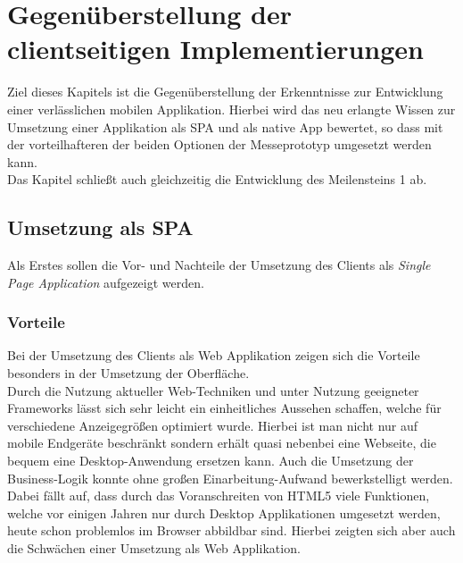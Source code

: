 \chapter{Gegenüberstellung der clientseitigen Implementierungen}
\label{cha:gegenueberstellung}
Ziel dieses Kapitels ist die Gegenüberstellung der Erkenntnisse zur Entwicklung einer verlässlichen mobilen Applikation. Hierbei wird das neu erlangte Wissen zur Umsetzung einer Applikation als SPA und als native App bewertet, so dass mit der vorteilhafteren der beiden Optionen der Messeprototyp umgesetzt werden kann. \\
Das Kapitel schließt auch gleichzeitig die Entwicklung des Meilensteins 1 ab.

\section{Umsetzung als SPA}
\label{sec:gegenueberstellung-SPA}
Als Erstes sollen die Vor- und Nachteile der Umsetzung des Clients als \textit{Single Page Application} aufgezeigt werden.

\subsection{Vorteile}
\label{sec:vorteile-SPA}
Bei der Umsetzung des Clients als Web Applikation zeigen sich die Vorteile besonders in der Umsetzung der Oberfläche. \\
Durch die Nutzung aktueller Web-Techniken und unter Nutzung geeigneter Frameworks lässt sich sehr leicht ein einheitliches Aussehen schaffen, welche für verschiedene Anzeigegrößen optimiert wurde. Hierbei ist man nicht nur auf mobile Endgeräte beschränkt sondern erhält quasi nebenbei eine Webseite, die bequem eine Desktop-Anwendung ersetzen kann. Auch die Umsetzung der Business-Logik konnte ohne großen Einarbeitung-Aufwand bewerkstelligt werden. Dabei fällt auf, dass durch das Voranschreiten von HTML5 viele Funktionen, welche vor einigen Jahren nur durch Desktop Applikationen umgesetzt werden, heute schon problemlos im Browser abbildbar sind. Hierbei zeigten sich aber auch die Schwächen einer Umsetzung als Web Applikation. 

